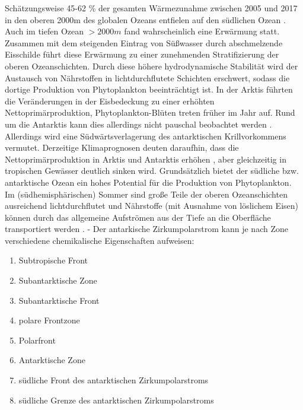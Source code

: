 \documentclass[12pt,a4paper,onecolumn,draft]{scrartcl}
\begin{document}
Schätzungsweise 45-62 \% der gesamten Wärmezunahme zwischen 2005 und 2017 in den oberen 2000m des globalen Ozeans entfielen auf den südlichen Ozean \citep{IPCCpol.2019}. Auch im tiefen Ozean $>2000m$ fand wahrscheinlich eine Erwärmung statt. Zusammen mit dem steigenden Eintrag von Süßwasser durch abschmelzende Eisschilde führt diese Erwärmung zu  einer zunehmenden Stratifizierung der oberen Ozeanschichten. Durch diese höhere hydrodynamische Stabilität wird  der Austausch von Nährstoffen in lichtdurchflutete Schichten erschwert, sodass die dortige Produktion von Phytoplankton beeinträchtigt ist. In der Arktis führten die Veränderungen in der Eisbedeckung zu einer erhöhten Nettoprimärproduktion, Phytoplankton-Blüten treten früher im Jahr auf. Rund um die Antarktis kann dies allerdings nicht pauschal beobachtet werden \citep{IPCCpol.2019}. Allerdings wird eine Südwärtsverlagerung des antarktischen Krillvorkommens vermutet. Derzeitige Klimaprognosen deuten daraufhin, dass die Nettoprimärproduktion in Arktis und Antarktis erhöhen , aber gleichzeitig in tropischen Gewässer deutlich sinken wird. Grundsätzlich bietet der südliche bzw. antarktische Ozean ein hohes Potential für die Produktion von Phytoplankton. Im (südhemisphärischen) Sommer sind große Teile der oberen Ozeanschichten ausreichend lichtdurchflutet und Nährstoffe (mit Ausnahme von löslichem Eisen) können durch das allgemeine Aufströmen aus der Tiefe an die Oberfläche transportiert werden \citep{Martin.1990}. -  Der antarkische Zirkumpolarstrom kann je nach Zone verschiedene chemikalische Eigenschaften aufweisen:

\begin{enumerate}
\item Subtropische Front
\item Subantarktische Zone
\item Subantarktische Front
\item polare Frontzone
\item Polarfront
\item Antarktische Zone
\item südliche Front des antarktischen Zirkumpolarstroms
\item südliche Grenze des antarktischen Zirkumpolarstroms
\end{enumerate}
\end{document}

